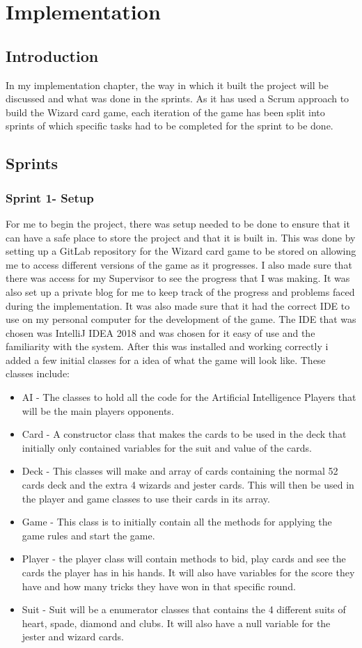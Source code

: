 \chapter{Implementation}

\section{Introduction}
In my implementation chapter, the way in which it built the project will be discussed and what was done in the sprints. As it has used a Scrum approach to build the Wizard card game, each iteration of the game has been split into sprints of which specific tasks had to be completed for the sprint to be done.
\section{Sprints}
\subsection{Sprint 1- Setup}
For me to begin the project, there was setup needed to be done to ensure that it can have a safe place to store the project and that it is built in. This was done by setting up a GitLab repository for the Wizard card game to be stored on allowing me to access different versions of the game as it progresses. I also made sure that there was access for my Supervisor to see the progress that I was making. It was also set up a private blog for me to keep track of the progress and problems faced during the implementation. It was also made sure that it had the correct IDE to use on my personal computer for the development of the game. The IDE that was chosen was IntelliJ IDEA 2018 and was chosen for it easy of use and the familiarity with the system. After this was installed and working correctly i added a few initial classes for a idea of what the game will look like. These classes include:
\begin{itemize}
\item AI - The classes to hold all the code for the Artificial Intelligence Players that will be the main players opponents.
\item Card - A constructor class that makes the cards to be used in the deck that initially only contained variables for the suit and value of the cards.
\item Deck - This classes will make and array of cards containing the normal 52 cards deck and the extra 4 wizards and jester cards. This will then be used in the player and game classes to use their cards in its array.
\item Game - This class is to initially contain all the methods for applying the game rules and start the game.
\item Player - the player class will contain methods to bid, play cards and see the cards the player has in his hands. It will also have variables for the score they have and how many tricks they have won in that specific round.
\item Suit - Suit will be a enumerator classes that contains the 4 different suits of heart, spade, diamond and clubs. It will also have a null variable for the jester and wizard cards.
\end{itemize}

